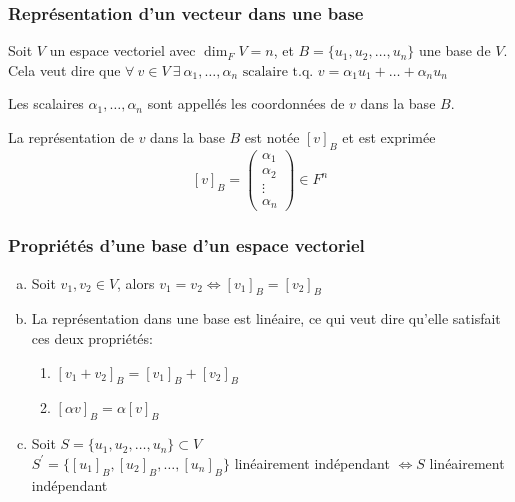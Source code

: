 \subsubsection{Représentation d'un vecteur dans une base}
Soit $V$ un espace vectoriel avec $\dim_F V = n$, et $B = \{ u_1, u_2, \ldots, u_n \}$ une base de $V$. \\
Cela veut dire que $ \forall \ v \in V  \ \exists \ \alpha_1, \ldots, \alpha_n \text{ scalaire t.q. } v = \alpha_1 u_1 + \ldots + \alpha_n u_n$
\begin{definition}
      Les scalaires $\alpha_1, \ldots, \alpha_n$ sont appellés les coordonnées de $v$ dans la base $B$.
\end{definition}
\begin{definition}
      La représentation de $v$ dans la base $B$ est notée $[v]_B$ et est exprimée
      \[
            [v]_B = \begin{pmatrix}
                  \alpha_1 \\
                  \alpha_2 \\
                  \vdots   \\
                  \alpha_n
            \end{pmatrix} \in F^n
      \]
\end{definition}

\subsubsection{Propriétés d'une base d'un espace vectoriel}
\begin{enumerate}[a)]
      \item Soit $v_1, v_2 \in V$, alors $v_1 = v_2 \iff [v_1]_B = [v_2]_B$
      \item La représentation dans une base est linéaire, ce qui veut dire qu'elle satisfait ces deux propriétés:
            \begin{enumerate}[1.]
                  \item $[v_1 + v_2]_B = [v_1]_B + [v_2]_B$
                  \item $[\alpha v]_B = \alpha [v]_B$
            \end{enumerate}
      \item Soit $S = \{ u_1, u_2, \ldots, u_n \} \subset V$ \\
            $S^\prime = \{ [u_1]_B, [u_2]_B, \ldots, [u_n]_B \}$ linéairement indépendant $\iff S$ linéairement indépendant
\end{enumerate}

